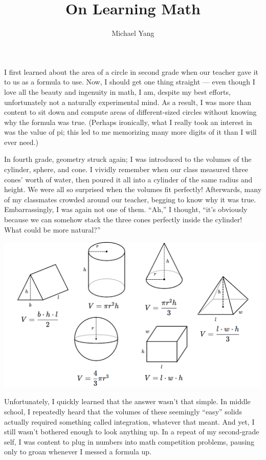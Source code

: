\documentclass{article}
\title{On Learning Math}
\author{Michael Yang}
\begin{document}
\maketitle
I first learned about the area of a circle in second grade when our teacher gave it to us as a formula to use. Now, I should get one thing straight — even though I love all the beauty and ingenuity in math, I am, despite my best efforts, unfortunately not a naturally experimental mind. As a result, I was more than content to sit down and compute areas of different-sized circles without knowing why the formula was true. (Perhaps ironically, what I really took an interest in was the value of pi; this led to me memorizing many more digits of it than I will ever need.) 

In fourth grade, geometry struck again; I was introduced to the volumes of the cylinder, sphere, and cone. I vividly remember when our class measured three cones’ worth of water, then poured it all into a cylinder of the same radius and height. We were all so surprised when the volumes fit perfectly! Afterwards, many of my classmates crowded around our teacher, begging to know why it was true. Embarrassingly, I was again not one of them. “Ah,” I thought, “it’s obviously because we can somehow stack the three cones perfectly inside the cylinder! What could be more natural?” 
\begin{center}
\includegraphics[scale=0.33]{images/geo_figures.png}
\end{center}
Unfortunately, I quickly learned that the answer wasn’t that simple. In middle school, I repeatedly heard that the volumes of these seemingly “easy” solids actually required something called integration, whatever that meant. And yet, I still wasn’t bothered enough to look anything up. In a repeat of my second-grade self, I was content to plug in numbers into math competition problems, pausing only to groan whenever I messed a formula up. 
\end{document}
